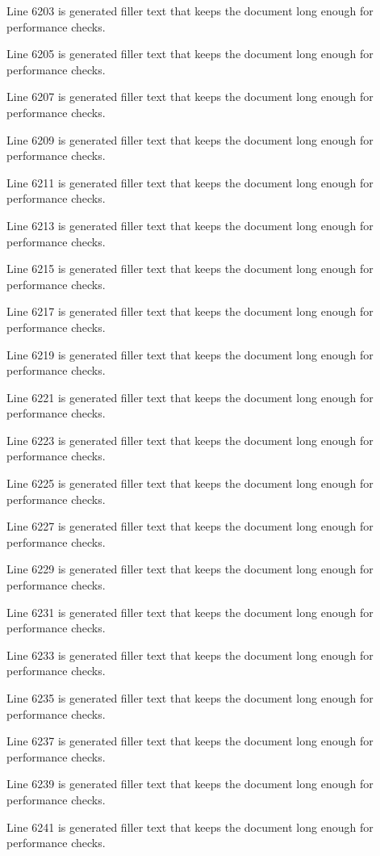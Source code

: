 Line 6203 is generated filler text that keeps the document long enough for performance checks.

Line 6205 is generated filler text that keeps the document long enough for performance checks.

Line 6207 is generated filler text that keeps the document long enough for performance checks.

Line 6209 is generated filler text that keeps the document long enough for performance checks.

Line 6211 is generated filler text that keeps the document long enough for performance checks.

Line 6213 is generated filler text that keeps the document long enough for performance checks.

Line 6215 is generated filler text that keeps the document long enough for performance checks.

Line 6217 is generated filler text that keeps the document long enough for performance checks.

Line 6219 is generated filler text that keeps the document long enough for performance checks.

Line 6221 is generated filler text that keeps the document long enough for performance checks.

Line 6223 is generated filler text that keeps the document long enough for performance checks.

Line 6225 is generated filler text that keeps the document long enough for performance checks.

Line 6227 is generated filler text that keeps the document long enough for performance checks.

Line 6229 is generated filler text that keeps the document long enough for performance checks.

Line 6231 is generated filler text that keeps the document long enough for performance checks.

Line 6233 is generated filler text that keeps the document long enough for performance checks.

Line 6235 is generated filler text that keeps the document long enough for performance checks.

Line 6237 is generated filler text that keeps the document long enough for performance checks.

Line 6239 is generated filler text that keeps the document long enough for performance checks.

Line 6241 is generated filler text that keeps the document long enough for performance checks.


